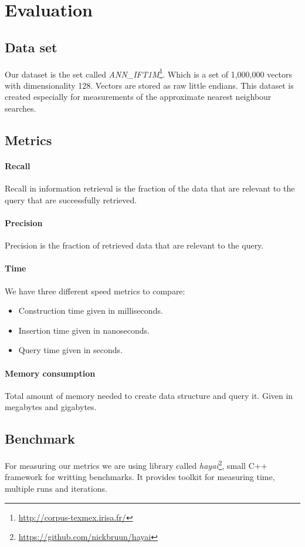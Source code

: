 \section{Evaluation}
 \subsection{Data set}
 Our dataset is the set called \textit{ANN\_IFT1M}\footnote{\url{http://corpus-texmex.irisa.fr/}}. Which is a set of 1,000,000 vectors
 with dimensionality 128. Vectors are stored as raw little endians.
 This dataset is created especially for measurements of the approximate nearest 
neighbour searches.  
 \subsection{Metrics}
 \paragraph{Recall}Recall in information retrieval is the fraction of the data that are relevant to the query that are successfully retrieved.
 \paragraph{Precision}Precision is the fraction of retrieved data that are relevant to the query.
 \paragraph{Time}We have three different speed metrics to compare:
 \begin{itemize}
  \item Construction time given in milliseconds. 
  \item Insertion time given in nanoseconds.
  \item Query time given in seconds.
\end{itemize}
 \paragraph{Memory consumption} Total amount of memory needed to create data structure and query it. Given in megabytes and gigabytes.
 \subsection{Benchmark} For measuring our metrics we are using library called 
 \textit{hayai}\footnote{\url{https://github.com/nickbruun/hayai}}, small C++ framework for writting benchmarks. It provides toolkit for measuring time, multiple runs and iterations.
